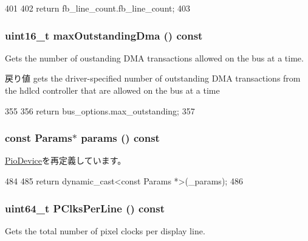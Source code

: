 \begin{DoxyCode}
401                                  {
402         return fb_line_count.fb_line_count;
403     }
\end{DoxyCode}
\hypertarget{classHDLcd_ac032891f1184bb5cfedef5c07217b0e9}{
\subsubsection[{maxOutstandingDma}]{\setlength{\rightskip}{0pt plus 5cm}uint16\_\-t maxOutstandingDma () const}}
\label{classHDLcd_ac032891f1184bb5cfedef5c07217b0e9}
Gets the number of oustanding DMA transactions allowed on the bus at a time.

\begin{DoxyReturn}{戻り値}
gets the driver-\/specified number of outstanding DMA transactions from the hdlcd controller that are allowed on the bus at a time 
\end{DoxyReturn}



\begin{DoxyCode}
355                                               {
356         return bus_options.max_outstanding;
357     }
\end{DoxyCode}
\hypertarget{classHDLcd_acd3c3feb78ae7a8f88fe0f110a718dff}{
\subsubsection[{params}]{\setlength{\rightskip}{0pt plus 5cm}const {\bf Params}$\ast$ params () const}}
\label{classHDLcd_acd3c3feb78ae7a8f88fe0f110a718dff}


\hyperlink{classPioDevice_acd3c3feb78ae7a8f88fe0f110a718dff}{PioDevice}を再定義しています。


\begin{DoxyCode}
484     {
485         return dynamic_cast<const Params *>(_params);
486     }
\end{DoxyCode}
\hypertarget{classHDLcd_a7b7fa24d6d051f77c5554b18b422f016}{
\subsubsection[{PClksPerLine}]{\setlength{\rightskip}{0pt plus 5cm}uint64\_\-t PClksPerLine () const}}
\label{classHDLcd_a7b7fa24d6d051f77c5554b18b422f016}
Gets the total number of pixel clocks per display line.

